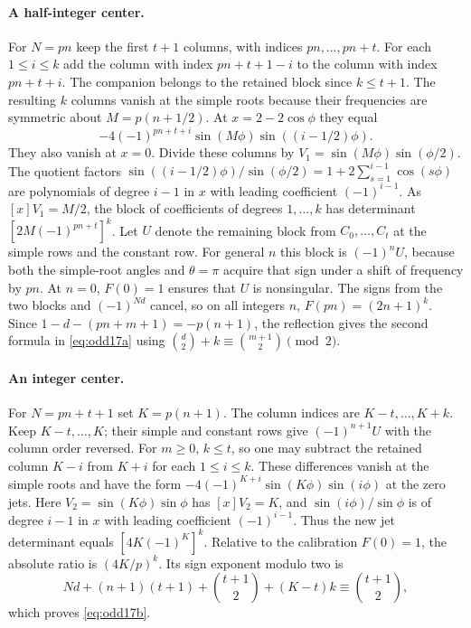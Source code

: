 \documentclass[11pt,a4paper]{article}
\begin{document}
\paragraph{A half-integer center.}
For $N=pn$ keep the first $t+1$ columns, with indices
$pn,\ldots,pn+t$. For each $1\le i\le k$ add the column with index
$pn+t+1-i$ to the column with index $pn+t+i$. The companion belongs
to the retained block since $k\le t+1$. The resulting $k$ columns
vanish at the simple roots because their frequencies are symmetric
about $M=p(n+1/2)$. At $x=2-2\cos\phi$ they equal
\[
 -4(-1)^{pn+t+i}\sin(M\phi)\sin((i-1/2)\phi).
\]
They also vanish at $x=0$. Divide these columns by
$V_1=\sin(M\phi)\sin(\phi/2)$. The quotient factors
$\sin((i-1/2)\phi)/\sin(\phi/2)=1+2\sum_{s=1}^{i-1}\cos(s\phi)$
are polynomials of degree $i-1$ in $x$ with leading coefficient
$(-1)^{i-1}$. As $[x]V_1=M/2$, the block of coefficients of
degrees $1,\ldots,k$ has determinant
$[2M(-1)^{pn+t}]^k$.
Let $U$ denote the remaining block from $C_0,\ldots,C_t$ at the
simple rows and the constant row. For general $n$ this block is
$(-1)^n U$, because both the simple-root angles and $\theta=\pi$
acquire that sign under a shift of frequency by $pn$.
At $n=0$, $F(0)=1$ ensures that $U$ is nonsingular. The signs from
the two blocks and $(-1)^{Nd}$ cancel, so on all integers $n$,
$F(pn)=(2n+1)^k$. Since $1-d-(pn+m+1)=-p(n+1)$, the reflection
gives the second formula in \eqref{eq:odd17a} using
$\binom d2+k\equiv\binom{m+1}2\pmod2$.

\paragraph{An integer center.}
For $N=pn+t+1$ set $K=p(n+1)$. The column indices are
$K-t,\ldots,K+k$. Keep $K-t,\ldots,K$; their simple and constant
rows give $(-1)^{n+1}U$ with the column order reversed. For
$m\ge0$, $k\le t$, so one may subtract the retained column $K-i$
from $K+i$ for each $1\le i\le k$. These differences vanish at
the simple roots and have the form
$-4(-1)^{K+i}\sin(K\phi)\sin(i\phi)$ at the zero jets.
Here $V_2=\sin(K\phi)\sin\phi$ has $[x]V_2=K$, and
$\sin(i\phi)/\sin\phi$ is of degree $i-1$ in $x$ with leading
coefficient $(-1)^{i-1}$. Thus the new jet determinant equals
$[4K(-1)^K]^k$. Relative to the calibration $F(0)=1$, the
absolute ratio is $(4K/p)^k$. Its sign exponent modulo two is
\[
 Nd+(n+1)(t+1)+\binom{t+1}{2}+(K-t)k
 \equiv\binom{t+1}{2},
\]
which proves \eqref{eq:odd17b}.
\end{document}
